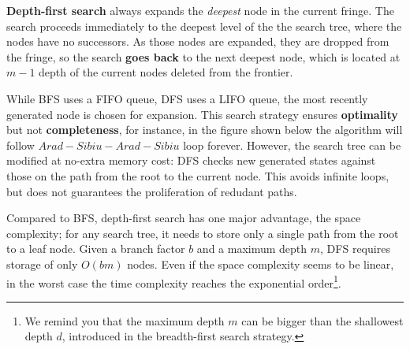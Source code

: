 \textbf{Depth-first search} always expands the \textit{deepest} node in the current fringe. The search proceeds immediately to the deepest level of the the search tree, where
the nodes have no successors. As those nodes are expanded, they are dropped from the fringe, so the search \textbf{goes back} to the next deepest node,
which is located at $m - 1$ depth of the current nodes deleted from the frontier. \vspace{3.5pt}

While BFS uses a FIFO queue, DFS uses a LIFO queue, the most recently generated node is chosen for expansion. This search strategy ensures \textbf{optimality} but not 
\textbf{completeness}, for instance, in the figure shown below the algorithm will follow $Arad-Sibiu-Arad-Sibiu$ loop forever. However, the search tree can be modified at no-extra
memory cost: DFS checks new generated states against those on the path from the root to the current node. This avoids infinite loops, but does not guarantees the proliferation
of redudant paths. \vspace{3.5pt}
\begin{center}
\end{center}

Compared to BFS, depth-first search has one major advantage, the space complexity; for any search tree, it needs to store only a single path from the root to a leaf node. Given 
a branch factor $b$ and a maximum depth $m$, DFS requires storage of only $O(bm)$ nodes. Even if the space complexity seems to be linear, in the worst case the time complexity
reaches the exponential order\footnote{We remind you that the maximum depth $m$ can be bigger than the shallowest depth $d$, introduced in the breadth-first search strategy.}.